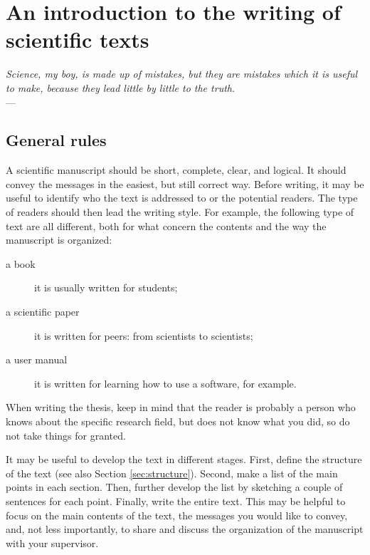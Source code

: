 \chapter{An introduction to the writing of scientific texts} \label{chap:aChapter}
\begin{flushright}{\slshape    
   Science, my boy, is made up of mistakes, but they are mistakes
   which it is useful to make, because they lead little by little
   to the truth}. \\ \medskip --- \citeauthor{verne_journey:1957}
    \citeyear{verne_journey:1957}
\end{flushright} 

\section{General rules}\label{sec:general_rules}
A scientific manuscript should be short, complete, clear, and logical.
It should convey the messages in the easiest, but still correct way.
Before writing, it may be useful to identify who the text is addressed to or the potential readers.
The type of readers should then lead the writing style. 
For example, the following type of text are all different, both for what concern the contents and the way the manuscript is organized:
\begin{description}
\item[a book] it is usually written for students;
\item[a scientific paper] it is written for peers: from scientists to scientists;
\item[a user manual] it is written for learning how to use a software, for example.
\end{description}

When writing the thesis, keep in mind that the reader is probably a person who knows about the specific research field, but does not know what you did, so do not take things for granted.

It may be useful to develop the text in different stages. 
First, define the structure of the text (see also Section \ref{sec:structure}).
Second, make a list of the main points in each section.
Then, further develop the list by sketching a couple of sentences for each point.
Finally, write the entire text.
This may be helpful to focus on the main contents of the text, the messages you would like to convey, and, not less importantly, to share and discuss the organization of the manuscript with your supervisor.

